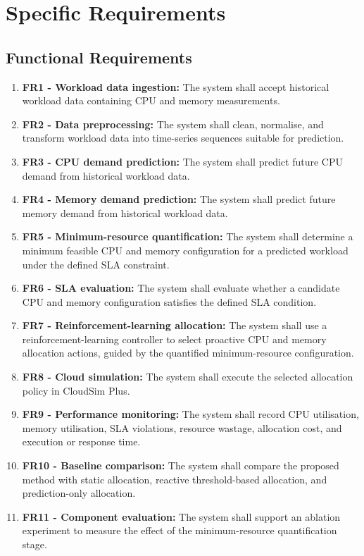\documentclass[12pt,a4paper]{report}
\begin{document}
\section{Specific Requirements}
\subsection{Functional Requirements}
\begin{enumerate}
    \item \textbf{FR1 - Workload data ingestion:} The system shall accept historical workload data containing CPU and memory measurements.
    \item \textbf{FR2 - Data preprocessing:} The system shall clean, normalise, and transform workload data into time-series sequences suitable for prediction.
    \item \textbf{FR3 - CPU demand prediction:} The system shall predict future CPU demand from historical workload data.
    \item \textbf{FR4 - Memory demand prediction:} The system shall predict future memory demand from historical workload data.
    \item \textbf{FR5 - Minimum-resource quantification:} The system shall determine a minimum feasible CPU and memory configuration for a predicted workload under the defined SLA constraint.
    \item \textbf{FR6 - SLA evaluation:} The system shall evaluate whether a candidate CPU and memory configuration satisfies the defined SLA condition.
    \item \textbf{FR7 - Reinforcement-learning allocation:} The system shall use a reinforcement-learning controller to select proactive CPU and memory allocation actions, guided by the quantified minimum-resource configuration.
    \item \textbf{FR8 - Cloud simulation:} The system shall execute the selected allocation policy in CloudSim Plus.
    \item \textbf{FR9 - Performance monitoring:} The system shall record CPU utilisation, memory utilisation, SLA violations, resource wastage, allocation cost, and execution or response time.
    \item \textbf{FR10 - Baseline comparison:} The system shall compare the proposed method with static allocation, reactive threshold-based allocation, and prediction-only allocation.
    \item \textbf{FR11 - Component evaluation:} The system shall support an ablation experiment to measure the effect of the minimum-resource quantification stage.
\end{enumerate}
\lipsum[34-36]
\end{document}
